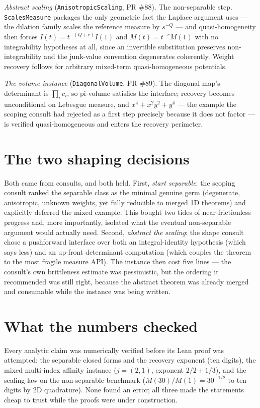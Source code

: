 \documentclass[11pt]{article}
\newcommand{\code}[1]{\texttt{#1}}
\begin{document}
\emph{Abstract scaling} (\code{AnisotropicScaling}, PR \#88). The
non-separable step. \code{ScalesMeasure} packages the only
geometric fact the Laplace argument uses --- the dilation family
scales the reference measure by $s^{-Q}$ --- and quasi-homogeneity
then forces $I(t) = t^{-(Q+r)} I(1)$ and $M(t) = t^{-r} M(1)$ with
no integrability hypotheses at all, since an invertible substitution
preserves non-integrability and the junk-value convention
degenerates coherently. Weight recovery follows for arbitrary
mixed-term quasi-homogeneous potentials.

\emph{The volume instance} (\code{DiagonalVolume}, PR \#89). The
diagonal map's determinant is $\prod_i c_i$, so pi-volume satisfies
the interface; recovery becomes unconditional on Lebesgue measure,
and $x^4 + x^2y^2 + y^4$ --- the example the scoping consult had
rejected as a first step precisely because it does not factor ---
is verified quasi-homogeneous and enters the recovery perimeter.

\section{The two shaping decisions}

Both came from consults, and both held. First, \emph{start
separable}: the scoping consult ranked the separable class as the
minimal genuine germ (degenerate, anisotropic, unknown weights, yet
fully reducible to merged 1D theorems) and explicitly deferred the
mixed example. This bought two tides of near-frictionless progress
and, more importantly, isolated what the eventual non-separable
argument would actually need. Second, \emph{abstract the scaling}:
the shape consult chose a pushforward interface over both an
integral-identity hypothesis (which says less) and an up-front
determinant computation (which couples the theorem to the most
fragile measure API). The instance then cost five lines --- the
consult's own brittleness estimate was pessimistic, but the
ordering it recommended was still right, because the abstract
theorem was already merged and consumable while the instance was
being written.

\section{What the numbers checked}

Every analytic claim was numerically verified before its Lean proof
was attempted: the separable closed forms and the recovery exponent
(ten digits), the mixed multi-index affinity instance
($j = (2,1)$, exponent $2/2 + 1/3$), and the scaling law on the
non-separable benchmark ($M(30)/M(1) = 30^{-1/2}$ to ten digits by
2D quadrature). None found an error; all three made the statements
cheap to trust while the proofs were under construction.
\end{document}
